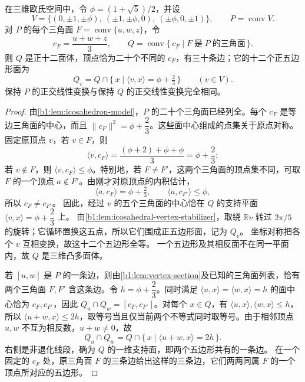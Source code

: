 \begin{lemma}[面中心构成的正十二面体]\label{b1:lem:dodecahedron-face-centers}
	在三维欧氏空间中，令 \(\phi=(1+\sqrt5)/2\)，并设
	\[
		V=\bigl\{(0,\pm1,\pm\phi),\ (\pm1,\pm\phi,0),\
		(\pm\phi,0,\pm1)\bigr\},\qquad P=\operatorname{conv}V.
	\]
	对 \(P\) 的每个三角面 \(F=\operatorname{conv}\{u,w,z\}\)，令
	\[
		c_F=\frac{u+w+z}{3},\qquad Q=\operatorname{conv}\{\,c_F\mid F\;\text{是}\;P\;\text{的三角面}\,\}.
	\]
	则 \(Q\) 是正十二面体，顶点恰为二十个不同的 \(c_F\)，有三十条边；它的十二个正五边形面为
	\[
		Q_v=Q\cap\{\,x\mid\langle v,x\rangle=\phi+\tfrac23\,\} \qquad(v\in V).
	\]
	保持 \(P\) 的正交线性变换与保持 \(Q\) 的正交线性变换完全相同。
\end{lemma}
\begin{proof}
	由\cref{b1:lem:icosahedron-model}，\(P\) 的二十个三角面已经列全。每个 \(c_F\) 是等边三角面的中心，而且 \(\lVert c_F\rVert^2=\phi+\dfrac23\)。这些面中心组成的点集关于原点对称。 固定原顶点 \(v\)，若 \(v\in F\)，则
	\[
		\langle v,c_F\rangle =\frac{(\phi+2)+\phi+\phi}{3}=\phi+\frac23;
	\]
	若 \(v\notin F\)，则 \(\langle v,c_F\rangle\leq\phi\)。特别地，若 \(F\ne F'\)，这两个三角面的顶点集不同，可取 \(F\) 的一个顶点 \(a\notin F'\)。由刚才对原顶点的内积估计，
	\[
		\langle a,c_F\rangle=\phi+\tfrac23, \qquad \langle a,c_{F'}\rangle\leq\phi,
	\]
	所以 \(c_F\ne c_{F'}\)。 因此，经过 \(v\) 的五个三角面的中心恰在 \(Q\) 的支持平面 \(\langle v,x\rangle=\phi+\dfrac23\) 上。 由\cref{b1:lem:icosahedral-vertex-stabilizer}，取绕 \(\mathbb Rv\) 转过 \(2\pi/5\) 的旋转；它循环置换这五点，所以它们围成正五边形面，记为 \(Q_v\)。 坐标对称把各个 \(v\) 互相变换，故这十二个五边形全等。 一个五边形及其相反面不在同一平面内，故 \(Q\) 是三维凸多面体。

	若 \([u,w]\) 是 \(P\) 的一条边，则由\cref{b1:lem:vertex-section}及已知的三角面列表，恰有两个三角面 \(F,F'\) 含这条边。令 \(h=\phi+\dfrac23\)。同时满足 \(\langle u,x\rangle=\langle w,x\rangle=h\) 的面中心恰为 \(c_F,c_{F'}\)，因此 \(Q_u\cap Q_w=[c_F,c_{F'}]\)。对每个 \(x\in Q\)，有 \(\langle u,x\rangle,\langle w,x\rangle\leq h\)，所以 \(\langle u+w,x\rangle\leq2h\)，取等号当且仅当前两个不等式同时取等号。由于相邻顶点 \(u,w\) 不互为相反数，\(u+w\ne0\)，故
	\[
		Q_u\cap Q_w =Q\cap\{\,x\mid\langle u+w,x\rangle=2h\,\}.
	\]
	右侧是非退化线段，确为 \(Q\) 的一维支持面，即两个五边形共有的一条边。 在一个固定的 \(c_F\) 处，原三角面 \(F\) 的三条边给出这样的三条边，它们两两同属 \(F\) 的一个顶点所对应的五边形。


\end{proof}
